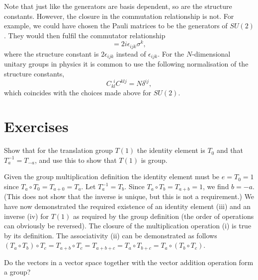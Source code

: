 \documentclass[notes.tex]{subfiles}
\begin{document}
Note that just like the generators are basis dependent, so are the structure constants. However, the closure in the commutation relationship is not. For example, we could have chosen the Pauli matrices to be the generators of $SU(2)$. They would then fulfil the commutator relationship
\begin{equation*}
[\sigma_i,\sigma_j]=2i\epsilon_{ijk}\sigma^k, 
\label{eq:pauli_algebra}
\end{equation*}
where the structure constant is $2\epsilon_{ijk}$ instead of $\epsilon_{ijk}$. For the $N$-dimensional unitary groups in physics it is common to use the following normalisation of the structure constants,
\begin{equation}
C_{kl}^{~~i}C_{}^{klj}=N\delta^{ij},
\label{eq:generator_normalisation}
\end{equation}
which coincides with the choices made above for $SU(2)$.



\section{Exercises}

\begin{Exercise}[]
Show that for the translation group $T(1)$ the identity element is $T_0$ and that $T_a^{-1} = T_{-a}$, and use this to show that $T(1)$ is group.
\end{Exercise}

\begin{Answer}
Given the group multiplication definition the identity element must be $e=T_0=1$ since $T_a\circ T_0=T_{a+0}=T_a$. Let $T_a^{-1} =T_b$. Since $T_a \circ T_b=T_{a+b}=1$, we find $b=-a$. (This does not show that the inverse is unique, but this is not a requirement.) We have now demonstrated the required existence of an identity element (iii) and an inverse (iv) for $T(1)$ as required by the group definition (the order of operations can obviously be reversed). The closure of the multiplication operation (i) is true by its definition. The associativity (ii) can be demonstrated as follows $(T_a\circ T_b)\circ T_c=T_{a+b}\circ T_c=T_{a+b+c}=T_{a}\circ T_{b+c}=T_a\circ (T_b\circ T_c)$.
\end{Answer}


\begin{Exercise}[]
Do the vectors in a vector space together with the vector addition operation form a group?
\end{Exercise}
\end{document}
